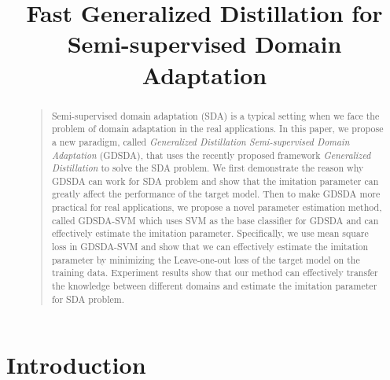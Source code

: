 \documentclass[letterpaper]{article}
\begin{document}
%
\title{Fast Generalized Distillation for Semi-supervised Domain Adaptation}
\maketitle
\begin{abstract}
\begin{quote}

Semi-supervised domain adaptation (SDA) is a typical setting when we face the problem of domain adaptation in the real applications. In this paper, we propose a new paradigm, called \textit{Generalized Distillation Semi-supervised Domain Adaptation} (GDSDA), that uses the recently proposed framework \textit{Generalized Distillation} \cite{lopez2015unifying} to solve the SDA problem.
We first demonstrate the reason why GDSDA can work for SDA problem and show that the imitation parameter can greatly affect the performance of the target model. Then to make GDSDA more practical for real applications, we propose a novel parameter estimation method, called GDSDA-SVM which uses SVM as the base classifier for GDSDA and can effectively estimate the imitation parameter. Specifically, we use mean square loss in GDSDA-SVM and show that we can effectively estimate the imitation parameter by minimizing the Leave-one-out loss of the target model on the training data. Experiment results show that our method can effectively transfer the knowledge between different domains and estimate the imitation parameter for SDA problem.
\end{quote}
\end{abstract}

\section{Introduction}


%

%
\end{document}
